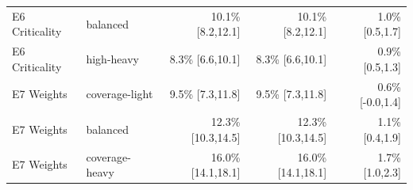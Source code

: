 \begin{table}[t]
{\begin{tabular}{llrrr}
E6 Criticality & balanced & 10.1\% [8.2,12.1] & 10.1\% [8.2,12.1] & 1.0\% [0.5,1.7] \\
E6 Criticality & high-heavy & 8.3\% [6.6,10.1] & 8.3\% [6.6,10.1] & 0.9\% [0.5,1.3] \\
E7 Weights & coverage-light & 9.5\% [7.3,11.8] & 9.5\% [7.3,11.8] & 0.6\% [-0.0,1.4] \\
E7 Weights & balanced & 12.3\% [10.3,14.5] & 12.3\% [10.3,14.5] & 1.1\% [0.4,1.9] \\
E7 Weights & coverage-heavy & 16.0\% [14.1,18.1] & 16.0\% [14.1,18.1] & 1.7\% [1.0,2.3] \\
\bottomrule
\end{tabular}
}
\end{table}
